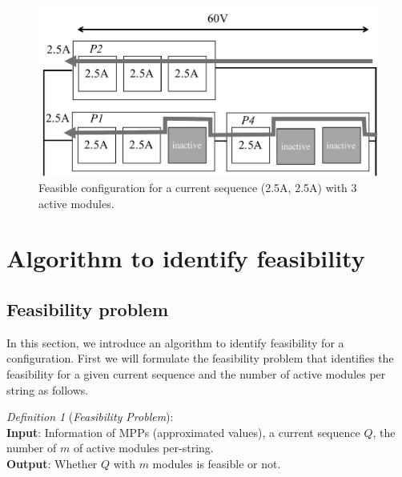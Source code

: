 \documentclass[journal]{IEEEtran}
\begin{document}
\begin{figure}[htbp]
    \centering
    \includegraphics[width=\linewidth]{fig/feasible-configuration.pdf}
    \caption{Feasible configuration for a current sequence (2.5A, 2.5A) with 3 active modules.}
    \label{fig:feasibleassign}
\end{figure}

\section{Algorithm to identify feasibility}\label{sec:algor-ident-feas}
\subsection{Feasibility problem}\label{sec:feasibility-problem}
In this section, we introduce an algorithm to identify feasibility for a configuration.
First we will formulate the feasibility problem that identifies the feasibility for a given current sequence and the number of active modules per string as follows.

\textit{Definition 1} (\textit{Feasibility Problem}):\\
\textbf{Input}: Information of MPPs (approximated values), a current sequence $Q$, the number of $m$ of active modules per-string.\\
\textbf{Output}: Whether $Q$ with $m$ modules is feasible or not.
\end{document}
